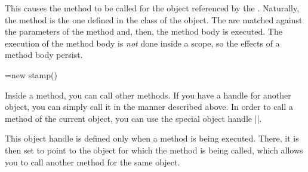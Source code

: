 \begin{pgfmanualentry}
  \pgfmanualbody
  This causes the method  to be called for the
  object referenced by the . Naturally, the method
  is the one defined in the class of the object. The 
  are matched against the parameters of the method and, then, the
  method body is executed. The execution of the method body is
  \emph{not} done inside a scope, so the effects of a method body
  persist.

\begin{codeexample}

\pgfoonew \mystamp=new stamp()

\end{codeexample}

  Inside a method, you can call other methods. If you have a handle
  for another object, you can simply call it in the manner described
  above. In order to call a method of the current object, you can use
  the special object handle |\pgfoothis|.

  \begin{command}{\pgfoothis}
    This object handle is defined only when a method is being
    executed. There, it is then set to point to the object for which
    the method is being called, which allows you to call another
    method for the same object.

\begin{codeexample}
\end{codeexample}
  \end{command}
\end{pgfmanualentry}



